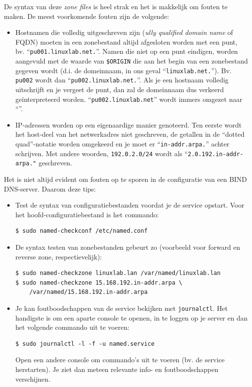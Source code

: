 De syntax van deze \emph{zone files} is heel strak en het is makkelijk om fouten te maken. De meest voorkomende fouten zijn de volgende:

\begin{itemize}
  \item Hostnamen die volledig uitgeschreven zijn (\emph{ully qualified domain name} of FQDN) moeten in een zonebestand altijd afgesloten worden met een punt, bv. ``\texttt{pu001.linuxlab.net.}''. Namen die niet op een punt eindigen, worden aangevuld met de waarde van \texttt{\$ORIGIN} die aan het begin van een zonebestand gegeven wordt (d.i. de domeinnaam, in ons geval ``\texttt{linuxlab.net.}''). Bv.  \texttt{pu002} wordt dan ``\texttt{pu002.linuxlab.net.}''. Als je een hostnaam volledig uitschrijft en je vergeet de punt, dan zal de domeinnaam dus verkeerd geïnterpreteerd worden. ``\texttt{pu002.linuxlab.net}'' wordt immers omgezet naar ``''.
\item IP-adressen worden op een eigenaardige manier genoteerd. Ten eerste wordt het host-deel van het netwerkadres niet geschreven, de getallen in de ``dotted quad''-notatie worden omgekeerd en je moet er ``\texttt{in-addr.arpa.}'' achter schrijven. Met andere woorden, \texttt{192.0.2.0/24} wordt als ``\texttt{2.0.192.in-addr-arpa."} geschreven.
\end{itemize}

Het is niet altijd evident om fouten op te sporen in de configuratie van een BIND DNS-server. Daarom deze tips:

\begin{itemize}
  \item Test de syntax van configuratiebestanden voordat je de service opstart. Voor het hoofd-configuratiebestand  is het commando:
    \begin{verbatim}
$ sudo named-checkconf /etc/named.conf
    \end{verbatim}
  \item De syntax testen van zonebestanden gebeurt zo (voorbeeld voor forward en reverse zone, respectievelijk):

    \begin{verbatim}
$ sudo named-checkzone linuxlab.lan /var/named/linuxlab.lan
$ sudo named-checkzone 15.168.192.in-addr.arpa \
    /var/named/15.168.192.in-addr.arpa
    \end{verbatim}

\item Je kan foutboodschappen van de service bekijken met \texttt{journalctl}. Het handigste is om een aparte console te openen, in te loggen op je server en dan het volgende commando uit te voeren:

    \begin{verbatim}
$ sudo journalctl -l -f -u named.service
    \end{verbatim}

  Open een andere console om commando's uit te voeren (bv. de service herstarten). Je ziet dan meteen relevante info- en foutboodschappen verschijnen.
\end{itemize}

